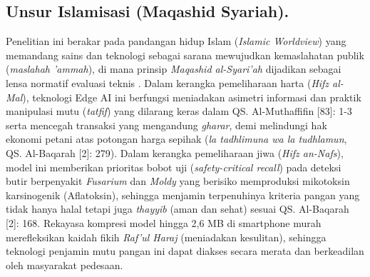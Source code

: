\documentclass[12pt,a4paper]{article}
\begin{document}
\subsection*{Unsur Islamisasi (Maqashid Syariah).} 

\indent Penelitian ini berakar pada pandangan hidup Islam (\textit{Islamic Worldview}) yang memandang sains dan teknologi sebagai sarana mewujudkan kemaslahatan publik
(\textit{maslahah 'ammah}), di mana prinsip \textit{Maqashid al-Syari'ah} dijadikan sebagai lensa normatif evaluasi teknis \autocite{syathibi1997, zarkasyi2013}. 
Dalam kerangka pemeliharaan harta (\textit{Hifz al-Mal}), teknologi Edge AI ini berfungsi meniadakan asimetri informasi dan praktik manipulasi mutu (\textit{tatfif})
yang dilarang keras dalam QS. Al-Muthaffifin [83]: 1-3 serta mencegah transaksi yang mengandung \textit{gharar}, demi melindungi hak ekonomi petani atas potongan
harga sepihak (\textit{la tadhlimuna wa la tudhlamun}, QS. Al-Baqarah [2]: 279). Dalam kerangka pemeliharaan jiwa (\textit{Hifz an-Nafs}), 
model ini memberikan prioritas bobot uji (\textit{safety-critical recall}) pada deteksi butir berpenyakit \textit{Fusarium} dan \textit{Moldy} 
yang berisiko memproduksi mikotoksin karsinogenik (Aflatoksin), sehingga menjamin terpenuhinya kriteria pangan yang tidak hanya halal tetapi juga \textit{thayyib}
(aman dan sehat) sesuai QS. Al-Baqarah [2]: 168. Rekayasa kompresi model hingga 2,6 MB di smartphone murah merefleksikan kaidah fikih \textit{Raf'ul Haraj} 
(meniadakan kesulitan), sehingga teknologi penjamin mutu pangan ini dapat diakses secara merata dan berkeadilan oleh masyarakat pedesaan.

\newpage
\printbibliography
\end{document}
